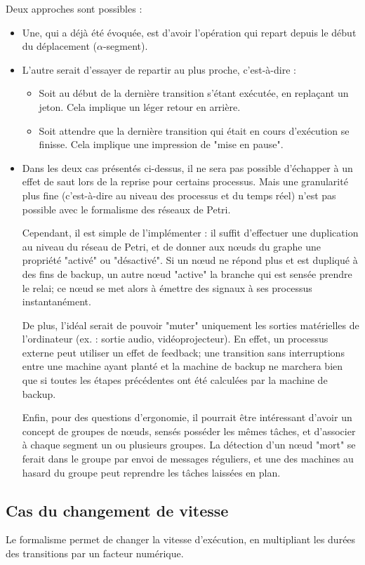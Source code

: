 Deux approches sont possibles :
\begin{itemize}
\item Une, qui a déjà été évoquée, est d'avoir l'opération qui repart depuis le début du déplacement ($\alpha$-segment).
\item L'autre serait d'essayer de repartir au plus proche, c'est-à-dire :  
\begin{itemize}
\item Soit au début de la dernière transition s'étant exécutée, en replaçant un jeton. Cela implique un léger retour en arrière.
\item Soit attendre que la dernière transition qui était en cours d'exécution se finisse. Cela implique une impression de "mise en pause".
\end{itemize}

\item Dans les deux cas présentés ci-dessus, il ne sera pas possible d'échapper à un effet de saut lors de la reprise pour certains processus. Mais une granularité plus fine (c'est-à-dire au niveau des processus et du temps réel) n'est pas possible avec le formalisme des réseaux de Petri.

Cependant, il est simple de l'implémenter : il suffit d'effectuer une duplication au niveau du réseau de Petri, et de donner aux nœuds du graphe une propriété "activé" ou "désactivé". Si un nœud ne répond plus et est dupliqué à des fins de backup, un autre nœud "active" la branche qui est sensée prendre le relai; ce nœud se met alors à émettre des signaux à ses processus instantanément.

De plus, l'idéal serait de pouvoir "muter" uniquement les sorties matérielles de l'ordinateur (ex. : sortie audio, vidéoprojecteur). En effet, un processus externe peut utiliser un effet de feedback; une transition sans interruptions entre une machine ayant planté et la machine de backup ne marchera bien que si toutes les étapes précédentes ont été calculées par la machine de backup.

Enfin, pour des questions d'ergonomie, il pourrait être intéressant d'avoir un concept de groupes de nœuds, sensés posséder les mêmes tâches, et d'associer à chaque segment un ou plusieurs groupes. La détection d'un nœud "mort" se ferait dans le groupe par envoi de messages réguliers, et une des machines au hasard du groupe peut reprendre les tâches laissées en plan.
\end{itemize}

\subsection{Cas du changement de vitesse}
Le formalisme permet de changer la vitesse d'exécution, en multipliant les durées des transitions par un facteur numérique.


